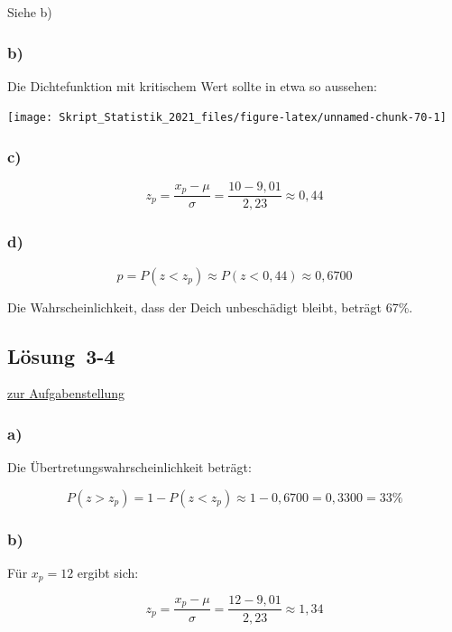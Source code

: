\documentclass[
  11pt,
  ngerman,
  a4paper,
]{report}
\begin{document}
Siehe b)

\hypertarget{b-10}{%
\subsubsection{b)}\label{b-10}}

Die Dichtefunktion mit kritischem Wert sollte in etwa so aussehen:

\begin{center}\texttt{[image: Skript\_Statistik\_2021\_files/figure-latex/unnamed-chunk-70-1]} \end{center}

\hypertarget{c-8}{%
\subsubsection{c)}\label{c-8}}

\[z_p=\frac{x_p- \mu}{\sigma} = \frac{10-9,01}{2,23}\approx0,44\]

\hypertarget{d-3}{%
\subsubsection{d)}\label{d-3}}

\[p=P(z<z_p)\approx P(z<0,44)\approx0,6700\]

Die Wahrscheinlichkeit, dass der Deich unbeschädigt bleibt, beträgt 67\%.

\hypertarget{loesung-3-4}{%
\subsection{Lösung~3-4}\label{loesung-3-4}}

\protect\hyperlink{aufgabe-3-4}{zur Aufgabenstellung}

\hypertarget{a-11}{%
\subsubsection{a)}\label{a-11}}

Die Übertretungswahrscheinlichkeit beträgt:

\[P(z>z_p) = 1- P(z<z_p) \approx 1-0,6700 = 0,3300 = 33\% \]

\hypertarget{b-11}{%
\subsubsection{b)}\label{b-11}}

Für \(x_p=12\) ergibt sich:

\[ z_p=\frac{x_p- \mu}{\sigma} = \frac{12-9,01}{2,23}\approx1,34 \]
\end{document}
